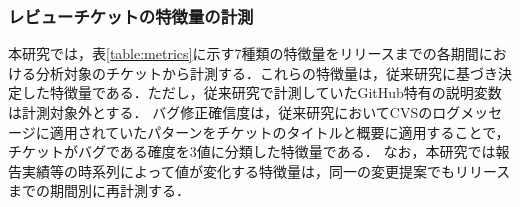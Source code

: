 \documentclass[T,J]{fose} %
\newcommand{\todo}[1]{\colorbox{yellow}{{\bf TODO}:}{\color{red} {\textbf{[#1]}}}}
\newcommand{\change}[1]{\colorbox{green}{{\bf CHANGE}:}{\color{black} {\textbf{[#1]}}}}
\begin{document}
\subsubsection{レビューチケットの特徴量の計測}
本研究では，表\ref{table:metrics}に示す7種類の特徴量をリリースまでの各期間における分析対象のチケットから計測する．これらの特徴量は，従来研究に基づき決定した特徴量である．ただし，従来研究で計測していたGitHub特有の説明変数は計測対象外とする．
バグ修正確信度は，従来研究\cite{bug}においてCVSのログメッセージに適用されていたパターンをチケットのタイトルと概要に適用することで，チケットがバグである確度を3値に分類した特徴量である．
なお，本研究では報告実績等の時系列によって値が変化する特徴量は，同一の変更提案でもリリースまでの期間別に再計測する．


\begin{table}[t]
  \caption{RQ1の分析に用いる7種類の特徴量}
  \label{table:metrics}
  \centering
  \vspace{0.5zh}
\end{table}
\end{document}
